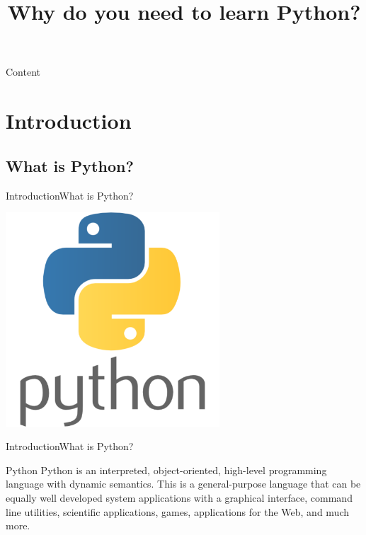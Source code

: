 \documentclass[10pt]{beamer}
\title[Why you need to learn Python?] %
{
	\textbf{Why do you need to learn Python?}
}
\begin{document}
	
{\1%
	\begin{frame} 
		\titlepage
	\end{frame}
}

\begin{frame}{Content}{}
	\tableofcontents
\end{frame}
		
\section{Introduction}

\subsection{What is Python?}


\begin{frame}{Introduction}{What is Python?}
	\begin{center}
		\includegraphics[width=0.6\textwidth]{pictures/python.png}
	\end{center}
\end{frame}

\begin{frame}{Introduction}{What is Python?}
	\begin{block}{Python}
		Python is an interpreted, object-oriented, high-level programming language with dynamic semantics.  This is a general-purpose language that can be equally well developed system applications with a graphical interface, command line utilities, scientific applications, games, applications for the Web, and much more.	
	\end{block}
\end{frame}
\end{document}

